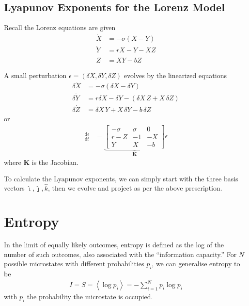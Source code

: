 \documentclass[10pt]{article}
\newcommand{\rd}[2]{\frac{\mathrm{d}#1}{\mathrm{d}#2}}
\newcommand{\expvalue}[1]{\left<#1\right>}
\begin{document}
\subsection{Lyapunov Exponents for the Lorenz Model}

Recall the Lorenz equations are given
\begin{align}
    \dot{X} &= -\sigma(X-Y)\\
    \dot{Y} &= rX - Y - XZ\\
    \dot{Z} &= XY - bZ
\end{align}

A small perturbation $\epsilon = (\delta X, \delta Y, \delta Z)$ evolves by the
linearized equations
\begin{align}
    \delta\dot{X} &= -\sigma(\delta X-\delta Y)\\
    \delta\dot{Y} &= r\delta X - \delta Y - (\delta X\,Z + X\, \delta Z)\\
    \delta\dot{Z} &= \delta X\,Y + X\, \delta Y - b\, \delta Z
\end{align}
or
\begin{align}
    \rd{\epsilon}{t} &= \underbrace{\begin{bmatrix}
        -\sigma & \sigma & 0\\
        r - Z & -1 & -X\\
        Y & X & -b
    \end{bmatrix}}_{\mathbf{K}}\epsilon
\end{align}
where $\mathbf{K}$ is the Jacobian.

To calculate the Lyapunov exponents, we can simply start with the three basis
vectors $\hat{\imath}, \hat{\jmath}, \hat{k}$, then we evolve and project as per
the above prescription.

\clearpage

\section{Entropy}

In the limit of equally likely outcomes, entropy is defined as the log of the
number of such outcomes, also associated with the ``information capacity.'' For
$N$ possible microstates with different probabilities $p_i$, we can generalise
entropy to be
\begin{align}
    I = S = \expvalue{\log p_i} = -\sum\limits_{i=1}^{N}p_i\log p_i
\end{align}
with $p_i$ the probability the microstate is occupied.
\end{document}
